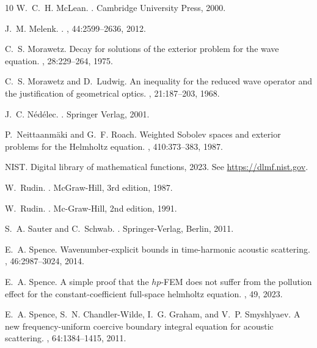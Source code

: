 \documentclass{birkjour}
\theoremstyle{definition}
\theoremstyle{remark}
\numberwithin{equation}{section}
\begin{document}
\begin{thebibliography}{10}
W.~C.~H. McLean.
.
\newblock Cambridge University Press, 2000.

J.~M. Melenk.
.
, 44:2599--2636, 2012.

C.~S. Morawetz.
\newblock Decay for solutions of the exterior problem for the wave equation.
, 28:229--264, 1975.

C.~S. Morawetz and D.~Ludwig.
\newblock An inequality for the reduced wave operator and the justification of
  geometrical optics.
, 21:187--203, 1968.

J.~C. N{\'e}d{\'e}lec.
.
\newblock Springer Verlag, 2001.

P.~Neittaanm\"aki and G.~F. Roach.
\newblock Weighted {S}obolev spaces and exterior problems for the {H}elmholtz
  equation.
, 410:373--383, 1987.

NIST.
\newblock Digital library of mathematical functions, 2023.
\newblock See \url{https://dlmf.nist.gov}.

W.~Rudin.
.
\newblock McGraw-Hill, 3rd edition, 1987.

W.~Rudin.
.
\newblock Mc-Graw-Hill, 2nd edition, 1991.

S.~A. Sauter and C.~Schwab.
.
\newblock Springer-Verlag, Berlin, 2011.

E.~A. Spence.
\newblock Wavenumber-explicit bounds in time-harmonic acoustic scattering.
, 46:2987--3024, 2014.

E.~A. Spence.
\newblock A simple proof that the $hp$-{FEM} does not suffer from the pollution
  effect for the constant-coefficient full-space helmholtz equation.
, 49, 2023.

E.~A. Spence, S.~N. Chandler-Wilde, I.~G. Graham, and V.~P. Smyshlyaev.
\newblock A new frequency-uniform coercive boundary integral equation for
  acoustic scattering.
, 64:1384--1415, 2011.


\end{thebibliography}
\end{document}
